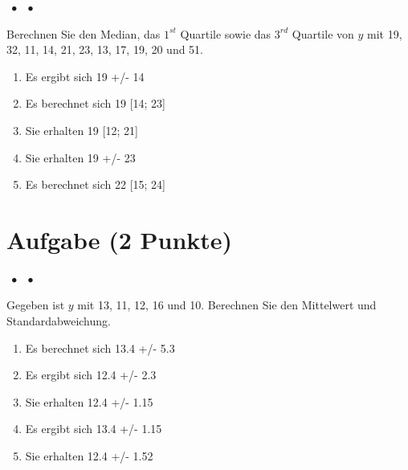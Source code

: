 \documentclass[a4paper, 9pt]{scrartcl}\usepackage[]{graphicx}\usepackage[]{xcolor}
\begin{document}
{%
\ifcollection
\begin{flushright}
\tiny\vspace{-2Ex}
\textbf{\examinhaltstart}
\exammodulemathstat $\;\bullet$
\exammodulestat $\;\bullet$
\exammodulestatbbv 
\vspace{-1Ex}
\end{flushright}
\fi




Berechnen Sie den Median, das $1^{st}$ Quartile sowie das $3^{rd}$ Quartile von $y$ mit 19, 32, 11, 14, 21, 23, 13, 17, 19, 20 und 51.




\begin{enumerate}
\item [\textbf{A} \msquare] Es ergibt sich 19 +/- 14
\item [\textbf{B} \msquare] Es berechnet sich 19 [14; 23]
\item [\textbf{C} \msquare] Sie erhalten 19 [12; 21]
\item [\textbf{D} \msquare] Sie erhalten 19 +/- 23
\item [\textbf{E} \msquare] Es berechnet sich 22 [15; 24]
\end{enumerate} 

\section{Aufgabe \hfill (2 Punkte)}

\ifcollection
\begin{flushright}
\tiny\vspace{-2Ex}
\textbf{\examinhaltstart}
\exammodulemathstat $\;\bullet$
\exammodulestat $\;\bullet$
\exammodulestatbbv 
\vspace{-1Ex}
\end{flushright}
\fi




Gegeben ist $y$ mit 13, 11, 12, 16 und 10. Berechnen Sie den Mittelwert und Standardabweichung.



\begin{enumerate}
\item [\textbf{A} \msquare] Es berechnet sich 13.4 +/- 5.3
\item [\textbf{B} \msquare] Es ergibt sich 12.4 +/- 2.3
\item [\textbf{C} \msquare] Sie erhalten 12.4 +/- 1.15
\item [\textbf{D} \msquare] Es ergibt sich 13.4 +/- 1.15
\item [\textbf{E} \msquare] Sie erhalten 12.4 +/- 1.52
\end{enumerate} 

}
\end{document}
